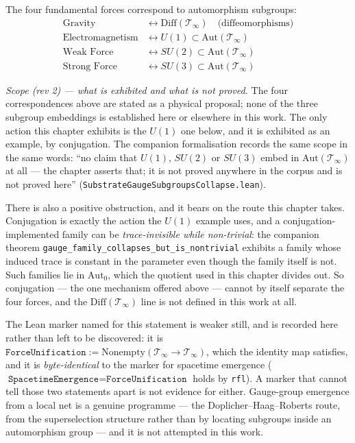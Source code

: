 \begin{thm}\label{thm:force-emergence}
The four fundamental forces correspond to automorphism subgroups:
\begin{align}
\text{Gravity} &\leftrightarrow \text{Diff}(\mathcal{T}_\infty) \quad \text{(diffeomorphisms)} \label{eq:gravity-diff}\\
\text{Electromagnetism} &\leftrightarrow U(1) \subset \text{Aut}(\mathcal{T}_\infty) \label{eq:em-u1}\\
\text{Weak Force} &\leftrightarrow SU(2) \subset \text{Aut}(\mathcal{T}_\infty) \label{eq:weak-su2}\\
\text{Strong Force} &\leftrightarrow SU(3) \subset \text{Aut}(\mathcal{T}_\infty) \label{eq:strong-su3}
\end{align}

\emph{Scope (rev 2) --- what is exhibited and what is not proved.} The four
correspondences above are stated as a physical proposal; none of the three
subgroup embeddings is established here or elsewhere in this work. The only
action this chapter exhibits is the $U(1)$ one below, and it is exhibited as an
example, by conjugation. The companion formalisation records the same scope in
the same words: ``no claim that $U(1)$, $SU(2)$ or $SU(3)$ embed in
$\mathrm{Aut}(\mathcal{T}_\infty)$ at all --- the chapter asserts that; it is
not proved anywhere in the corpus and is not proved here''
(\texttt{SubstrateGaugeSubgroupsCollapse.lean}).

There is also a positive obstruction, and it bears on the route this chapter
takes. Conjugation is exactly the action the $U(1)$ example uses, and a
conjugation-implemented family can be \emph{trace-invisible while non-trivial}:
the companion theorem \texttt{gauge\_family\_collapses\_but\_is\_nontrivial}
exhibits a family whose induced trace is constant in the parameter even though
the family itself is not. Such families lie in $\mathrm{Aut}_0$, which the
quotient used in this chapter divides out. So conjugation --- the one mechanism
offered above --- cannot by itself separate the four forces, and the
$\mathrm{Diff}(\mathcal{T}_\infty)$ line is not defined in this work at all.

The Lean marker named for this statement is weaker still, and is recorded here
rather than left to be discovered: it is
$\texttt{ForceUnification} := \mathrm{Nonempty}(\mathcal{T}_\infty \to
\mathcal{T}_\infty)$, which the identity map satisfies, and it is
\emph{byte-identical} to the marker for spacetime emergence
($\texttt{SpacetimeEmergence} = \texttt{ForceUnification}$ holds by
\texttt{rfl}). A marker that cannot tell those two statements apart is not
evidence for either. Gauge-group emergence from a local net is a genuine
programme --- the Doplicher--Haag--Roberts route, from the superselection
structure rather than by locating subgroups inside an automorphism group ---
and it is not attempted in this work.
\end{thm}

